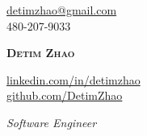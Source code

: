 \begin{center}
  \begin{minipage}[c]{0.33\textwidth}
    \raggedright
    \href{mailto:detimzhao@gmail.com}{{detimzhao@gmail.com}} \\
    \small 480-207-9033
  \end{minipage}%
  \begin{minipage}[c]{0.34\textwidth}
    \centering
    \textbf{\Huge \scshape Detim Zhao}
  \end{minipage}%
  \begin{minipage}[c]{0.33\textwidth}
    \raggedleft
    \href{https://www.linkedin.com/in/detimzhao/}{{linkedin.com/in/detimzhao}} \\
    \href{https://github.com/DetimZhao}{{github.com/DetimZhao}}
  \end{minipage}

  \vspace{6pt}

  {\large\itshape Software Engineer}
\end{center}